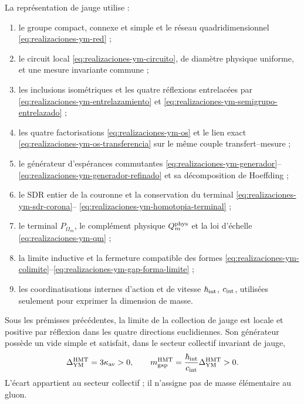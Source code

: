 La représentation de jauge utilise :
\begin{enumerate}
 \item le groupe compact, connexe et simple et le réseau quadridimensionnel
       \eqref{eq:realizaciones-ym-red} ;
 \item le circuit local \eqref{eq:realizaciones-ym-circuito}, de diamètre physique uniforme, et une mesure invariante commune ;
 \item les inclusions isométriques et les quatre réflexions entrelacées par
       \eqref{eq:realizaciones-ym-entrelazamiento} et
       \eqref{eq:realizaciones-ym-semigrupo-entrelazado} ;
 \item les quatre factorisations
       \eqref{eq:realizaciones-ym-os} et le lien exact
       \eqref{eq:realizaciones-ym-os-transferencia} sur le même couple
       transfert--mesure ;
 \item le générateur d'espérances commutantes \eqref{eq:realizaciones-ym-generador}--\eqref{eq:realizaciones-ym-generador-refinado} et sa décomposition de Hoeffding ;
 \item le SDR entier de la couronne et la conservation du terminal
       \eqref{eq:realizaciones-ym-sdr-corona}--
       \eqref{eq:realizaciones-ym-homotopia-terminal} ;
 \item le terminal \(P_{\Omega_m}\), le complément physique
       \(Q_m^{\rm phys}\) et la loi d’échelle
       \eqref{eq:realizaciones-ym-qm} ;
 \item la limite inductive et la fermeture compatible des formes \eqref{eq:realizaciones-ym-colimite}--\eqref{eq:realizaciones-ym-gap-forma-limite} ;
 \item les coordinatisations internes d'action et de vitesse \(\hbar_{\rm int}\), \(c_{\rm int}\), utilisées seulement pour exprimer la dimension de masse.
\end{enumerate}

\begin{theorem}
\label{thm:realizaciones-ym}
Sous les prémisses précédentes, la limite de la collection de jauge est locale et positive par réflexion dans les quatre directions euclidiennes. Son générateur possède un vide simple et satisfait, dans le secteur collectif invariant de jauge,
\begin{equation}\label{eq:realizaciones-ym-gap-limite}
 \Delta_{\rm YM}^{\rm HMT}=3\kappa_{\rm av}>0,
 \qquad
 m_{\rm gap}^{\rm HMT}
 =\frac{\hbar_{\rm int}}{c_{\rm int}}
  \Delta_{\rm YM}^{\rm HMT}>0.
\end{equation}
L’écart appartient au secteur collectif ; il n’assigne pas de masse élémentaire au
gluon.
\end{theorem}


